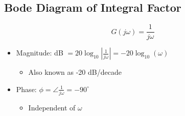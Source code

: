 \documentclass[a4paper]{article}
\begin{document}
\subsection{Bode Diagram of Integral Factor}
$$G(j\omega) = \frac{1}{j\omega}$$
\begin{minipage}{0.45\textwidth}
\begin{itemize}
    \item Magnitude: dB $=20\log_{10}\left|\displaystyle\frac{1}{j\omega}\right| = -20\log_{10}(\omega)$
    \begin{itemize}[label=$\circ$]
        \item Also known as -20 dB/decade
    \end{itemize}
    \item Phase: $\phi = \angle\displaystyle\frac{1}{j\omega} = -90^\circ$
    \begin{itemize}[label=$\circ$]
        \item Independent of $\omega$
    \end{itemize}
\end{itemize}
\end{minipage}
\end{document}
